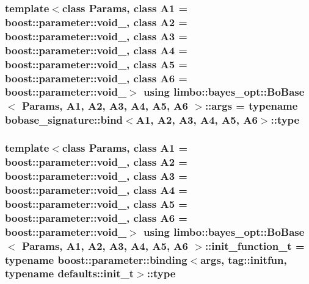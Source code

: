 \subsubsection[{args}]{\setlength{\rightskip}{0pt plus 5cm}template$<$class Params, class A1 = boost\+::parameter\+::void\+\_\+, class A2 = boost\+::parameter\+::void\+\_\+, class A3 = boost\+::parameter\+::void\+\_\+, class A4 = boost\+::parameter\+::void\+\_\+, class A5 = boost\+::parameter\+::void\+\_\+, class A6 = boost\+::parameter\+::void\+\_\+$>$ using {\bf limbo\+::bayes\+\_\+opt\+::\+Bo\+Base}$<$ Params, A1, A2, A3, A4, A5, A6 $>$\+::{\bf args} =  typename bobase\+\_\+signature\+::bind$<$A1, A2, A3, A4, A5, A6$>$\+::type}\label{classlimbo_1_1bayes__opt_1_1_bo_base_a800d7d9dec5ac0c12b93150f12db9be3}
\hypertarget{classlimbo_1_1bayes__opt_1_1_bo_base_a0cd0e388e42c62bc38e02c096d8ae245}{}
\subsubsection[{init\+\_\+function\+\_\+t}]{\setlength{\rightskip}{0pt plus 5cm}template$<$class Params, class A1 = boost\+::parameter\+::void\+\_\+, class A2 = boost\+::parameter\+::void\+\_\+, class A3 = boost\+::parameter\+::void\+\_\+, class A4 = boost\+::parameter\+::void\+\_\+, class A5 = boost\+::parameter\+::void\+\_\+, class A6 = boost\+::parameter\+::void\+\_\+$>$ using {\bf limbo\+::bayes\+\_\+opt\+::\+Bo\+Base}$<$ Params, A1, A2, A3, A4, A5, A6 $>$\+::{\bf init\+\_\+function\+\_\+t} =  typename boost\+::parameter\+::binding$<${\bf args}, tag\+::initfun, typename {\bf defaults\+::init\+\_\+t}$>$\+::type}\label{classlimbo_1_1bayes__opt_1_1_bo_base_a0cd0e388e42c62bc38e02c096d8ae245}
\hypertarget{classlimbo_1_1bayes__opt_1_1_bo_base_a5e23d523dd2a16b866a2660721b937bb}{}
